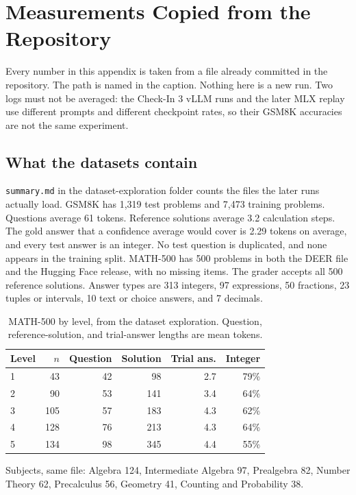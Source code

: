 \section{Measurements Copied from the Repository}
\label{sec:appendix}
Every number in this appendix is taken from a file already committed in the repository.
The path is named in the caption.
Nothing here is a new run.
Two logs must not be averaged: the Check-In 3 vLLM runs and the later MLX replay use different prompts and different checkpoint rates, so their GSM8K accuracies are not the same experiment.

\subsection{What the datasets contain}
\texttt{summary.md} in the dataset-exploration folder counts the files the later runs actually load.
GSM8K has 1{,}319 test problems and 7{,}473 training problems.
Questions average 61 tokens.
Reference solutions average 3.2 calculation steps.
The gold answer that a confidence average would cover is 2.29 tokens on average, and every test answer is an integer.
No test question is duplicated, and none appears in the training split.
MATH-500 has 500 problems in both the DEER file and the Hugging Face release, with no missing items.
The grader accepts all 500 reference solutions.
Answer types are 313 integers, 97 expressions, 50 fractions, 23 tuples or intervals, 10 text or choice answers, and 7 decimals.

\begin{table}[!t]
\caption{MATH-500 by level, from the dataset exploration. Question, reference-solution, and trial-answer lengths are mean tokens.}
\label{tab:explore}
\centering
\footnotesize
\begin{tabular}{@{}lrrrrr@{}}
\toprule
Level & $n$ & Question & Solution & Trial ans. & Integer \\
\midrule
1 & 43 & 42 & 98 & 2.7 & 79\% \\
2 & 90 & 53 & 141 & 3.4 & 64\% \\
3 & 105 & 57 & 183 & 4.3 & 62\% \\
4 & 128 & 76 & 213 & 4.3 & 64\% \\
5 & 134 & 98 & 345 & 4.4 & 55\% \\
\bottomrule
\end{tabular}
\end{table}

Subjects, same file: Algebra 124, Intermediate Algebra 97, Prealgebra 82, Number Theory 62, Precalculus 56, Geometry 41, Counting and Probability 38.

